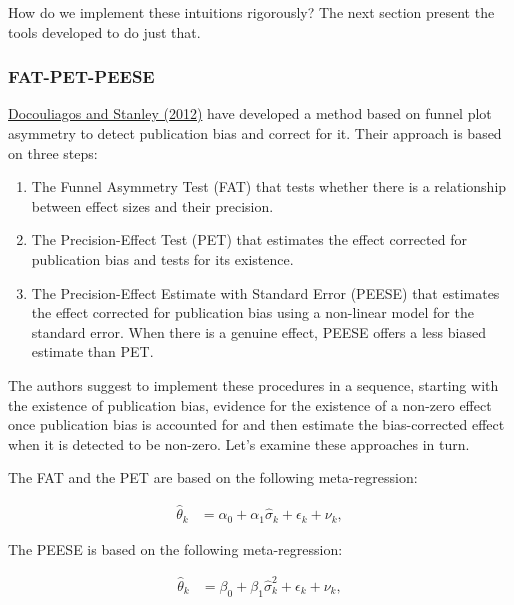 \documentclass[
]{book}
\providecommand{\tightlist}{%
  \setlength{\itemsep}{0pt}\setlength{\parskip}{0pt}}
\theoremstyle{definition}
\theoremstyle{definition}
\theoremstyle{definition}
\theoremstyle{definition}
\theoremstyle{remark}
\begin{document}
How do we implement these intuitions rigorously?
The next section present the tools developed to do just that.

\hypertarget{fat-pet-peese}{%
\subsubsection{FAT-PET-PEESE}\label{fat-pet-peese}}

\href{https://books.google.fr/books?hl=fr\&lr=\&id=jSQEdEsL7VoC\&oi=fnd\&pg=PP2\&dq=doucouliagos+and+stanley+meta-regression+analysis+in+economics\&ots=jTXmePff2F\&sig=Dm5EOhOroc5K8EUYvqK4fvJrPs8\#v=onepage\&q=doucouliagos\%20and\%20stanley\%20meta-regression\%20analysis\%20in\%20economics\&f=false}{Docouliagos and Stanley (2012)} have developed a method based on funnel plot asymmetry to detect publication bias and correct for it.
Their approach is based on three steps:

\begin{enumerate}
\def\labelenumi{\arabic{enumi}.}
\tightlist
\item
  The Funnel Asymmetry Test (FAT) that tests whether there is a relationship between effect sizes and their precision.
\item
  The Precision-Effect Test (PET) that estimates the effect corrected for publication bias and tests for its existence.
\item
  The Precision-Effect Estimate with Standard Error (PEESE) that estimates the effect corrected for publication bias using a non-linear model for the standard error.
  When there is a genuine effect, PEESE offers a less biased estimate than PET.
\end{enumerate}

The authors suggest to implement these procedures in a sequence, starting with the existence of publication bias, evidence for the existence of a non-zero effect once publication bias is accounted for and then estimate the bias-corrected effect when it is detected to be non-zero.
Let's examine these approaches in turn.

The FAT and the PET are based on the following meta-regression:

\begin{align*}
\hat{\theta}_k & = \alpha_0 + \alpha_1\hat{\sigma}_k  + \epsilon_k + \nu_k,
\end{align*}

The PEESE is based on the following meta-regression:

\begin{align*}
\hat{\theta}_k & = \beta_0 + \beta_1\hat{\sigma}^2_k  + \epsilon_k + \nu_k,
\end{align*}
\end{document}
